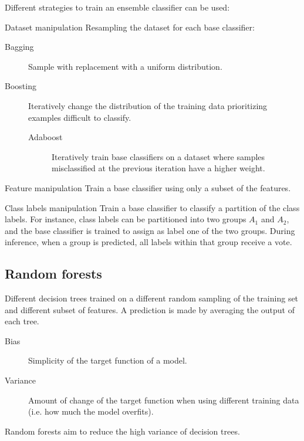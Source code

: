 Different strategies to train an ensemble classifier can be used:
\begin{descriptionlist}
    \item[Dataset manipulation] Resampling the dataset for each base classifier:
        \begin{description}
            \item[Bagging] 
                Sample with replacement with a uniform distribution.
            \item[Boosting] 
                Iteratively change the distribution of the training data 
                prioritizing examples difficult to classify.
                \begin{description}
                    \item[Adaboost] 
                        Iteratively train base classifiers on a dataset where samples 
                        misclassified at the previous iteration have a higher weight.
                \end{description}
        \end{description}
    
    \item[Feature manipulation]
        Train a base classifier using only a subset of the features.

    \item[Class labels manipulation]
        Train a base classifier to classify a partition of the class labels.
        For instance, class labels can be partitioned into two groups $A_1$ and $A_2$, and
        the base classifier is trained to assign as label one of the two groups.
        During inference, when a group is predicted, all labels within that group receive a vote.
\end{descriptionlist}


\subsection{Random forests}

Different decision trees trained on a different random sampling of the training set and different subset of features.
A prediction is made by averaging the output of each tree.

\begin{description}
    \item[Bias] 
        Simplicity of the target function of a model.
    \item[Variance] 
        Amount of change of the target function when using different training data (i.e. how much the model overfits).
\end{description}

Random forests aim to reduce the high variance of decision trees.